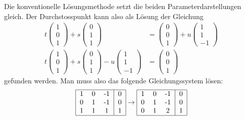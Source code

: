 \begin{loesung}
Die konventionelle Lösungsmethode setzt die beiden Parameterdarstellungen
gleich.
Der Durchstosspunkt kann also als Lösung der Gleichung
\begin{align*}
t\begin{pmatrix}1\\0\\1\end{pmatrix}
+
s\begin{pmatrix}0\\1\\1\end{pmatrix}
&=
\begin{pmatrix}0\\0\\1\end{pmatrix}+u\begin{pmatrix}1\\1\\-1\end{pmatrix}
\\
t\begin{pmatrix}1\\0\\1\end{pmatrix}
+
s\begin{pmatrix}0\\1\\1\end{pmatrix}
-u\begin{pmatrix}1\\1\\-1\end{pmatrix}
&=
\begin{pmatrix}0\\0\\1\end{pmatrix}
\end{align*}
gefunden werden.
Man muss also das folgende Gleichungssystem lösen:
\begin{align*}
\begin{tabular}{|ccc|c|}
\hline
1&0&-1&0\\
0&1&-1&0\\
1&1&1&1\\
\hline
\end{tabular}
&\rightarrow
\begin{tabular}{|ccc|c|}
\hline
1&0&-1&0\\
0&1&-1&0\\
0&1&2&1\\
\hline
\end{tabular}
\\

\end{align*}
\end{loesung}
